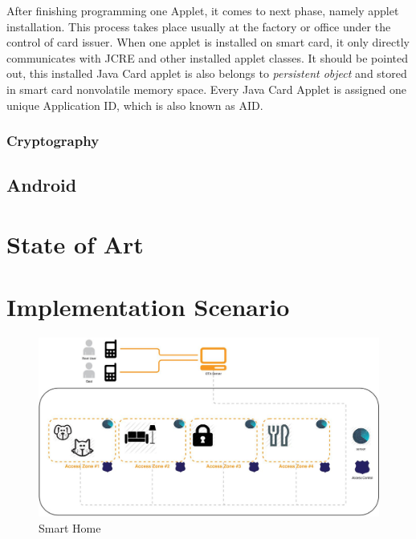 \documentclass[]{llncs}
\begin{document}
After finishing programming one Applet, it comes to next phase, namely applet installation. This process takes place usually at the factory or office under the control of card issuer. When one applet is installed on smart card, it only directly communicates with JCRE and other installed applet classes. It should be pointed out, this installed Java Card applet is also belongs to \emph{persistent object} and stored in smart card nonvolatile memory space. Every Java Card Applet is assigned one unique Application ID, which is also known as AID.

\subsubsection{Cryptography}

\subsection{Android}

\section{State of Art}
\section{Implementation Scenario}
 \begin{figure}[!htbp]
	\centering
	\includegraphics[width=1.2\textwidth]{homeoverview.jpg}
		\caption[ ]{Smart Home}
	\label{fig:SmartHome}
\end{figure}
\end{document}
